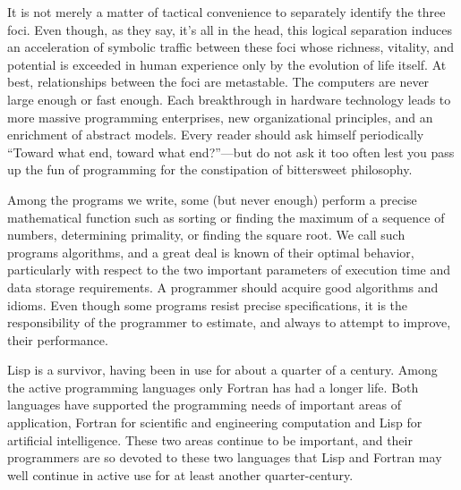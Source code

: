 It is not merely a matter of tactical convenience to separately identify the three foci.
Even though, as they say, it’s all in the head, this logical separation induces an acceleration of symbolic traffic between these foci whose richness, vitality, and potential is exceeded in human experience only by the evolution of life itself.
At best, relationships between the foci are metastable.
The computers are never large enough or fast enough.
Each breakthrough in hardware technology leads to more massive programming enterprises, new organizational principles, and an enrichment of abstract models.
Every reader should ask himself periodically “Toward what end, toward what end?”---but do not ask it too often lest you pass up the fun of programming for the constipation of bittersweet philosophy.

Among the programs we write, some (but never enough) perform a precise mathematical function such as sorting or finding the maximum of a sequence of numbers, determining primality, or finding the square root.
We call such programs algorithms, and a great deal is known of their optimal behavior, particularly with respect to the two important parameters of execution time and data storage requirements.
A programmer should acquire good algorithms and idioms.
Even though some programs resist precise specifications, it is the responsibility of the programmer to estimate, and always to attempt to improve, their performance.

Lisp is a survivor, having been in use for about a quarter of a century.
Among the active programming languages only Fortran has had a longer life.
Both languages have supported the programming needs of important areas of application, Fortran for scientific and engineering computation and Lisp for artificial intelligence.
These two areas continue to be important, and their programmers are so devoted to these two languages that Lisp and Fortran may well continue in active use for at least another quarter-century.

